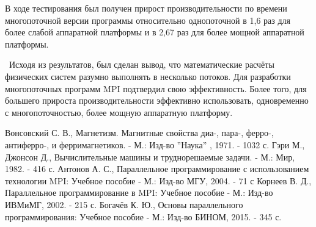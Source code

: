 \documentclass[14pt,a4paper,report]{ncc}
\begin{document}
В ходе тестирования был получен прирост производительности по времени многопоточной версии программы относительно однопоточной в 1,6 раз для более слабой аппаратной платформы и в 2,67 раз для более мощной аппаратной платформы. 

\
Исходя из результатов, был сделан вывод, что математические расчёты физических систем разумно выполнять в несколько потоков. Для разработки многопоточных программ MPI подтвердил свою эффективность. Более того, для большего прироста производительности эффективно использовать, одновременно с многопоточностью, более мощную аппаратную платформу.
 
 
\renewcommand{\bibname}{Список использованных источников}
\begin{thebibliography}{}
	Вонсовский С. В., Магнетизм. Магнитные свойства диа-, пара-, ферро-, антиферро-, и ферримагнетиков. - М.: Изд-во ''Наука'' , 1971. - 1032 с.
   \bibitem{litlink0}Гэри М., Джонсон Д., Вычислительные машины и труднорешаемые задачи. - М.: Мир, 1982. - 416 с.   
   \bibitem{litlink1} Антонов А. С., Параллельное программирование с использованием технологии MPI:
Учебное пособие - М.: Изд-во МГУ, 2004. - 71 с
     Корнеев В. Д., Параллельное программирование в MPI: Учебное пособие - М.: Изд-во ИВМиМГ, 2002. - 215 с.
    \bibitem{Bogachev} Богачёв К. Ю., Основы параллельного программирования: Учебное пособие - М.: Изд-во БИНОМ, 2015. - 345 с. 
     
\end{thebibliography}
\end{document}
